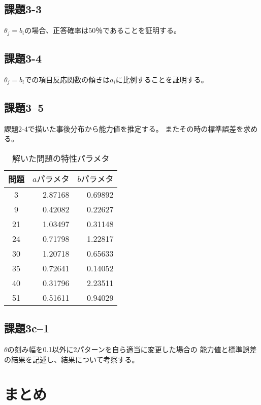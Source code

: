 \documentclass[12pt]{jarticle}
\begin{document}
\subsection{課題3-3}
\begin{shadebox}
    $\theta_j=b_i$の場合、正答確率は$50％$であることを証明する。
\end{shadebox}

\subsection{課題3-4}
\begin{shadebox}
    $\theta_j=b_i$での項目反応関数の傾きは$a_i$に比例することを証明する。
\end{shadebox}



\subsection{課題3–5}
\begin{shadebox}
    課題2-4で描いた事後分布から能力値を推定する。
    またその時の標準誤差を求める。
\end{shadebox}


\begin{table}[htb]
    \begin{center}
        \caption{解いた問題の特性パラメタ}
        \begin{tabular}{|c|r|r|}
            \hline
            問題 & $aパラメタ$ & $bパラメタ$ \\
            \hline
            3    & 2.87168     & 0.69892     \\
            9    & 0.42082     & 0.22627     \\
            21   & 1.03497     & 0.31148     \\
            24   & 0.71798     & 1.22817     \\
            30   & 1.20718     & 0.65633     \\
            35   & 0.72641     & 0.14052     \\
            40   & 0.31796     & 2.23511     \\
            51   & 0.51611     & 0.94029     \\
            \hline
        \end{tabular}
    \end{center}
\end{table}


\subsection{課題3c–1}
\begin{shadebox}
    $\theta$の刻み幅を0.1以外に2パターンを自ら適当に変更した場合の
    能力値と標準誤差の結果を記述し、結果について考察する。
\end{shadebox}


\section{まとめ}



\clearpage
\appendix
\end{document}
